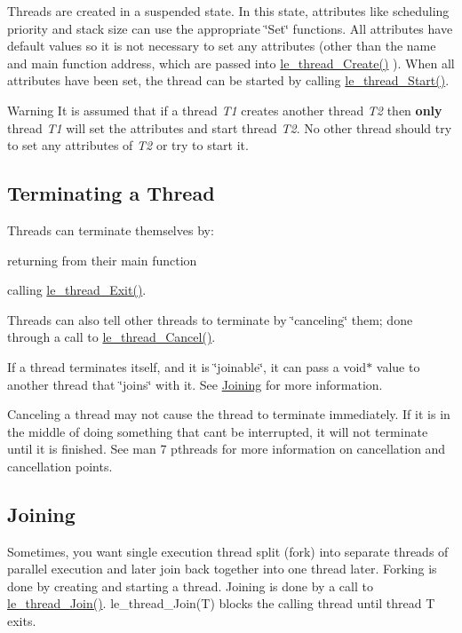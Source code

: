 Threads are created in a suspended state. In this state, attributes like scheduling priority and stack size can use the appropriate \char`\"{}\+Set\char`\"{} functions. All attributes have default values so it is not necessary to set any attributes (other than the name and main function address, which are passed into \hyperlink{le__thread_8h_a87e02a46f92e9e3e11ed28a2b265872f}{le\+\_\+thread\+\_\+\+Create()} ). When all attributes have been set, the thread can be started by calling \hyperlink{le__thread_8h_a38df3877ee5ab9fac17b2fc0be46c27e}{le\+\_\+thread\+\_\+\+Start()}.

\begin{DoxyWarning}{Warning}
It is assumed that if a thread {\itshape T1} creates another thread {\itshape T2} then {\bfseries only} thread {\itshape T1} will set the attributes and start thread {\itshape T2}. No other thread should try to set any attributes of {\itshape T2} or try to start it.
\end{DoxyWarning}
\hypertarget{c_threading_threadTerminating}{}\subsection{Terminating a Thread}\label{c_threading_threadTerminating}
Threads can terminate themselves by\+:
\begin{DoxyItemize}
\item returning from their main function
\item calling \hyperlink{le__thread_8h_a6b8e349107ae6628ed8807588f044faa}{le\+\_\+thread\+\_\+\+Exit()}.
\end{DoxyItemize}

Threads can also tell other threads to terminate by \char`\"{}canceling\char`\"{} them; done through a call to {\ttfamily \hyperlink{le__thread_8h_a0f1c1b98f354a96e6e31e55a71b58f6a}{le\+\_\+thread\+\_\+\+Cancel()}}.

If a thread terminates itself, and it is \char`\"{}joinable\char`\"{}, it can pass a {\ttfamily void$\ast$} value to another thread that \char`\"{}joins\char`\"{} with it. See \hyperlink{c_threading_threadJoining}{Joining} for more information.

Canceling a thread may not cause the thread to terminate immediately. If it is in the middle of doing something that can\textquotesingle{}t be interrupted, it will not terminate until it is finished. See \textquotesingle{}man 7 pthreads\textquotesingle{} for more information on cancellation and cancellation points.\hypertarget{c_threading_threadJoining}{}\subsection{Joining}\label{c_threading_threadJoining}
Sometimes, you want single execution thread split (fork) into separate threads of parallel execution and later join back together into one thread later. Forking is done by creating and starting a thread. Joining is done by a call to \hyperlink{le__thread_8h_adf7f24fec4859ca12a52b16ce43fd9b8}{le\+\_\+thread\+\_\+\+Join()}. le\+\_\+thread\+\_\+\+Join(\+T) blocks the calling thread until thread T exits.

